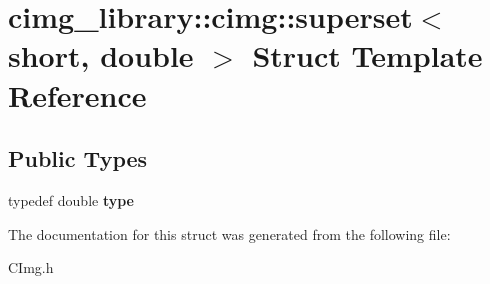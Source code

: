 \hypertarget{structcimg__library_1_1cimg_1_1superset_3_01short_00_01double_01_4}{\section{cimg\-\_\-library\-:\-:cimg\-:\-:superset$<$ short, double $>$ Struct Template Reference}
\label{structcimg__library_1_1cimg_1_1superset_3_01short_00_01double_01_4}
}
\subsection*{Public Types}
\begin{DoxyCompactItemize}
\item 
\hypertarget{structcimg__library_1_1cimg_1_1superset_3_01short_00_01double_01_4_af4fe1e61c94321c543a1eb8ade078e42}{typedef double {\bfseries type}}\label{structcimg__library_1_1cimg_1_1superset_3_01short_00_01double_01_4_af4fe1e61c94321c543a1eb8ade078e42}

\end{DoxyCompactItemize}


The documentation for this struct was generated from the following file\-:\begin{DoxyCompactItemize}
\item 
C\-Img.\-h\end{DoxyCompactItemize}
